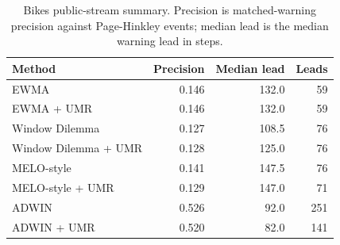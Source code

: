 \begin{table}[!htbp]
\centering
\caption{Bikes public-stream summary. Precision is matched-warning precision against Page-Hinkley events; median lead is the median warning lead in steps.}
\label{tab:real_world_umr}
\begin{tabular}{lrrr}
\toprule
Method & Precision & Median lead & Leads \\
\midrule
EWMA & 0.146 & 132.0 & 59 \\
EWMA + UMR & 0.146 & 132.0 & 59 \\
Window Dilemma & 0.127 & 108.5 & 76 \\
Window Dilemma + UMR & 0.128 & 125.0 & 76 \\
MELO-style & 0.141 & 147.5 & 76 \\
MELO-style + UMR & 0.129 & 147.0 & 71 \\
ADWIN & 0.526 & 92.0 & 251 \\
ADWIN + UMR & 0.520 & 82.0 & 141 \\
\bottomrule
\end{tabular}
\end{table}
